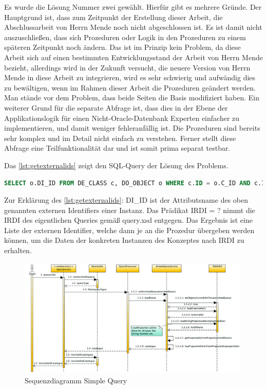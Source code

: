 Es wurde die Lösung Nummer zwei gewählt. Hierfür gibt es mehrere Gründe. Der Hauptgrund ist, dass zum Zeitpunkt der Erstellung dieser Arbeit, die Abschlussarbeit von Herrn Mende noch nicht abgeschlossen ist. Es ist damit nicht auszuschließen, dass sich Prozeduren oder Logik in den Prozeduren zu einem späteren Zeitpunkt noch ändern. Das ist im Prinzip kein Problem, da diese Arbeit sich auf einen bestimmten Entwicklungsstand der Arbeit von Herrn Mende bezieht, allerdings wird in der Zukunft versucht, die neuere Version von Herrn Mende in diese Arbeit zu integrieren, wird es sehr schwierig und aufwändig dies zu bewältigen, wenn im Rahmen dieser Arbeit die Prozeduren geändert werden. Man stände vor dem Problem, dass beide Seiten die Basis modifiziert haben. 
Ein weiterer Grund für die separate Abfrage ist, dass dies in der Ebene der Applikationslogik für einen Nicht-\gls{Oracle}-Datenbank Experten einfacher zu implementieren, und damit weniger fehleranfällig ist. Die Prozeduren sind bereits sehr komplex und im Detail nicht einfach zu verstehen. 
Ferner stellt diese Abfrage eine Teilfunktionalität dar und ist somit prima separat testbar.  

Das \autoref{lst:getexternalids} zeigt den SQL-Query der Lösung des Problems.

\begin{lstlisting}[caption=SQL Query - Externe IDs abfragen, language=SQL, label=lst:getexternalids]
SELECT o.DI_ID FROM DE_CLASS c, DO_OBJECT o WHERE c.ID = o.C_ID AND c.IRDI = ?
\end{lstlisting}

Zur Erklärung des \autoref{lst:getexternalids}:
DI\_ID ist der Attributsname des oben genannten externen Identifiers einer Instanz. Das Prädikat \gls{IRDI} = ? nimmt die \gls{IRDI} des eigentlichen Queries gemäß query.xsd entgegen. Das Ergebnis ist eine Liste der externen Identifier, welche dann je an die Prozedur übergeben werden können, um die Daten der konkreten Instanzen des Konzeptes nach \gls{IRDI} zu erhalten. 

\begin{figure}[htbp]
	\centering
		\includegraphics[width=0.99\textwidth]{images/plib_simple_query_sequence_diagram.jpg}
		\caption{Sequenzdiagramm Simple Query}
	\label{fig:sequenzdiagrammsimplequery}
\end{figure}


